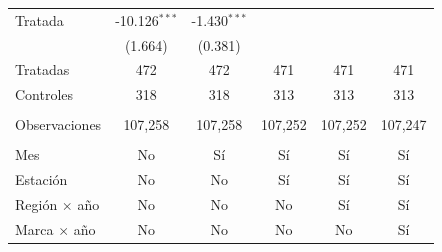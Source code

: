 \begin{tabular}{lccccc}
   Tratada              & -10.126$^{***}$ & -1.430$^{***}$ &                &                &   \\   
                        & (1.664)         & (0.381)        &                &                &   \\   
   Tratadas             & 472             & 472            & 471            & 471            & 471\\  
   Controles            & 318             & 318            & 313            & 313            & 313\\  
    \\
   Observaciones        & 107,258         & 107,258        & 107,252        & 107,252        & 107,247\\  
    \\
   Mes                  & No              & Sí             & Sí             & Sí             & Sí\\  
   Estación             & No              & No             & Sí             & Sí             & Sí\\  
   Región $\times$ año  & No              & No             & No             & Sí             & Sí\\  
   Marca $\times$ año   & No              & No             & No             & No             & Sí\\  
   \bottomrule
\end{tabular}
\par\endgroup


